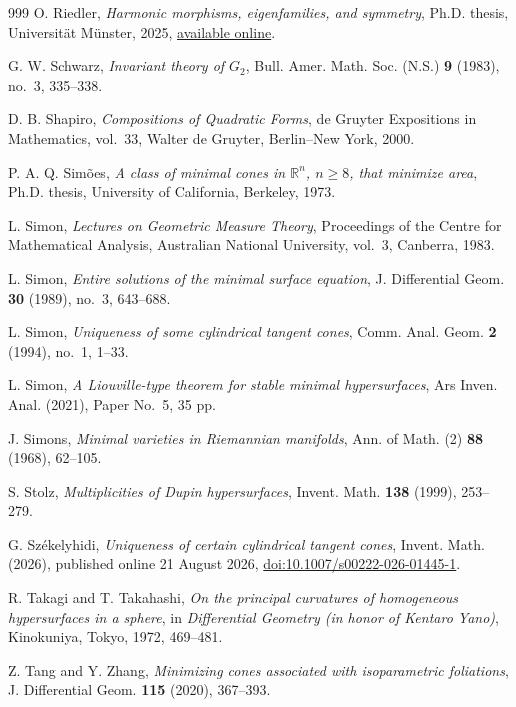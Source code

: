 \begin{thebibliography}{999}
O. Riedler,
\emph{Harmonic morphisms, eigenfamilies, and symmetry},
Ph.D. thesis, Universit\"at M\"unster, 2025,
\href{https://d-nb.info/1365542378/34}{available online}.

G. W. Schwarz,
\emph{Invariant theory of $G_2$},
Bull. Amer. Math. Soc. (N.S.) \textbf{9} (1983), no.~3, 335--338.

D. B. Shapiro,
\emph{Compositions of Quadratic Forms},
de Gruyter Expositions in Mathematics, vol.~33,
Walter de Gruyter, Berlin--New York, 2000.

P. A. Q. Sim\~oes,
\emph{A class of minimal cones in \(\mathbb R^n\), \(n\geq8\),
that minimize area}, Ph.D. thesis, University of California, Berkeley, 1973.

L. Simon,
\emph{Lectures on Geometric Measure Theory},
Proceedings of the Centre for Mathematical Analysis, Australian National
University, vol.~3, Canberra, 1983.

L. Simon,
\emph{Entire solutions of the minimal surface equation},
J. Differential Geom. \textbf{30} (1989), no.~3, 643--688.

L. Simon,
\emph{Uniqueness of some cylindrical tangent cones},
Comm. Anal. Geom. \textbf{2} (1994), no.~1, 1--33.

L. Simon,
\emph{A Liouville-type theorem for stable minimal hypersurfaces},
Ars Inven. Anal. (2021), Paper No.~5, 35 pp.

J. Simons,
\emph{Minimal varieties in Riemannian manifolds},
Ann. of Math. (2) \textbf{88} (1968), 62--105.

S. Stolz,
\emph{Multiplicities of Dupin hypersurfaces},
Invent. Math. \textbf{138} (1999), 253--279.

G. Sz\'ekelyhidi,
\emph{Uniqueness of certain cylindrical tangent cones},
Invent. Math. (2026), published online 21 August 2026,
\href{https://doi.org/10.1007/s00222-026-01445-1}{doi:10.1007/s00222-026-01445-1}.

R. Takagi and T. Takahashi,
\emph{On the principal curvatures of homogeneous hypersurfaces in a sphere},
in \emph{Differential Geometry (in honor of Kentaro Yano)},
Kinokuniya, Tokyo, 1972, 469--481.

Z. Tang and Y. Zhang,
\emph{Minimizing cones associated with isoparametric foliations},
J. Differential Geom. \textbf{115} (2020), 367--393.


\end{thebibliography}
